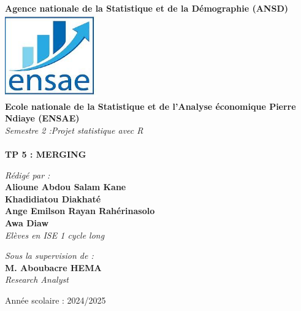 \documentclass[
]{article}
\begin{document}
\begin{titlepage}
\begin{center}
        \textbf{\large Agence nationale de la Statistique et de la Démographie (ANSD)}\\[0.2cm]
        
        \includegraphics[width=4cm]{../Figures/LOGO3.jpeg} \\[0.1cm]  %
        
        \textbf{\large Ecole nationale de la Statistique et de l'Analyse économique Pierre Ndiaye (ENSAE)}\\[0.4cm]
        
        \textit{\LARGE Semestre 2 :Projet statistique avec R }\\[0.3cm]
        \textit{\LARGE  }\\[0.3cm]

        \textbf{\Huge \color{green} \textsf{TP 5 : MERGING}}\\[0.2cm]
        
        \begin{minipage}{0.5\textwidth}
    \begin{flushleft} \large
        \emph{\textsf{Rédigé par :}}\\
        \textbf{Alioune Abdou Salam Kane}\\
        \textbf{Khadidiatou Diakhaté}\\
        \textbf{Ange Emilson Rayan Rahérinasolo}\\
        \textbf{Awa Diaw}\\
        \textit{Elèves en ISE 1 cycle long}
    \end{flushleft}
\end{minipage}
        \hfill
        \begin{minipage}{0.4\textwidth}
            \begin{flushright} \large
                \emph{\textsf{Sous la supervision de :}} \\
                \textbf{M. Aboubacre HEMA}\\
                \textit{Research Analyst }
            \end{flushright}
        \end{minipage}

        \vfill 

        {\large \textsf{Année scolaire : 2024/2025}}\\[0.5cm]
        
    \end{center}
\end{titlepage}  
\end{document}
